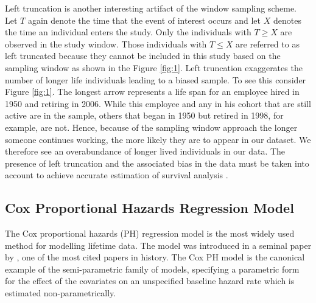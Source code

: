 \documentclass[12pt,letterpaper]{article}
\begin{document}
 Left truncation is another interesting artifact of the window sampling scheme. Let $T$ again denote the time that the event of interest occurs and let $X$ denotes the time an individual enters the study. Only the individuals with $T \geq X$ are observed in the study window.  Those individuals with $T \leq X$ are referred to as left truncated because they cannot be included in this study based on the sampling window as shown in the Figure \ref{fig:1}. Left truncation exaggerates the number of longer life individuals leading to a biased sample. To see this consider Figure \ref{fig:1}. The longest arrow represents a life span for an employee hired in 1950 and retiring in 2006. While this employee and any in his cohort that are still active are in the sample, others that began in 1950 but retired in 1998, for example, are not. Hence, because of the sampling window approach the longer someone continues working, the more likely they are to appear in our dataset.  We therefore see an overabundance of longer lived individuals in our data.  The presence of left truncation and the associated bias in the data must be taken into account to achieve accurate estimation of survival analysis \citep{carrion2010}.



\subsection{Cox Proportional Hazards Regression Model}
The Cox proportional hazards (PH) regression model is the most widely used method for modelling lifetime data. The model was introduced in a seminal paper by \citet{cox1972}, one of the most cited papers in history. The Cox PH model is the canonical example of the semi-parametric family of models, specifying a parametric form for the effect of the covariates on an unspecified baseline hazard rate which is estimated non-parametrically.
\end{document}

